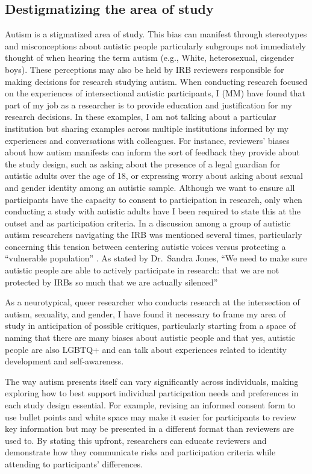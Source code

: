 \documentclass[
  11pt,
]{book}
\begin{document}
\subsection{Destigmatizing the area of study}\label{destigmatizing-the-area-of-study}

Autism is a stigmatized area of study. This bias can manifest through stereotypes and misconceptions about autistic people particularly subgroups not immediately thought of when hearing the term autism (e.g., White, heterosexual, cisgender boys). These perceptions may also be held by IRB reviewers responsible for making decisions for research studying autism. When conducting research focused on the experiences of intersectional autistic participants, I (MM) have found that part of my job as a researcher is to provide education and justification for my research decisions. In these examples, I am not talking about a particular institution but sharing examples across multiple institutions informed by my experiences and conversations with colleagues. For instance, reviewers' biases about how autism manifests can inform the sort of feedback they provide about the study design, such as asking about the presence of a legal guardian for autistic adults over the age of 18, or expressing worry about asking about sexual and gender identity among an autistic sample. Although we want to ensure all participants have the capacity to consent to participation in research, only when conducting a study with autistic adults have I been required to state this at the outset and as participation criteria. In a discussion among a group of autistic autism researchers navigating the IRB was mentioned several times, particularly concerning this tension between centering autistic voices versus protecting a ``vulnerable population'' \citep[p.~215]{dwyer_expert_2021}. As stated by Dr.~Sandra Jones, ``We need to make sure autistic people are able to actively participate in research: that we are not protected by IRBs so much that we are actually silenced'' \citep[p.~215]{dwyer_expert_2021}

As a neurotypical, queer researcher who conducts research at the intersection of autism, sexuality, and gender, I have found it necessary to frame my area of study in anticipation of possible critiques, particularly starting from a space of naming that there are many biases about autistic people and that yes, autistic people are also LGBTQ+ and can talk about experiences related to identity development and self-awareness.

The way autism presents itself can vary significantly across individuals, making exploring how to best support individual participation needs and preferences in each study design essential. For example, revising an informed consent form to use bullet points and white space may make it easier for participants to review key information but may be presented in a different format than reviewers are used to. By stating this upfront, researchers can educate reviewers and demonstrate how they communicate risks and participation criteria while attending to participants' differences.
\end{document}
